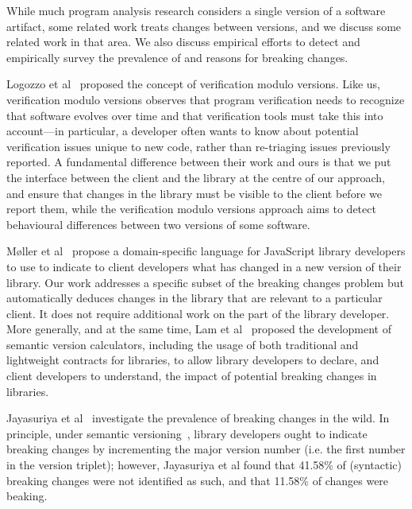 While much program analysis research considers a single version of a software artifact, some related work treats changes between versions, and we discuss some related work in that area. We also discuss empirical efforts to detect and empirically survey the prevalence of and reasons for breaking changes.

Logozzo et al~\cite{logozzo14:_verif_modul_version} proposed the concept of verification modulo versions. Like us, verification modulo versions observes that program verification needs to recognize that software evolves over time and that verification tools must take this into account---in particular, a developer often wants to know about potential verification issues unique to new code, rather than re-triaging issues previously reported. A fundamental difference between their work and ours is that we put the interface between the client and the library at the centre of our approach, and ensure that changes in the library must be visible to the client before we report them, while the verification modulo versions approach aims to detect behavioural differences between two versions of some software.

Møller et al~\cite{møller20:_detec_locat_javas_progr_affec} propose a domain-specific language for JavaScript library developers to use to indicate to client developers what has changed in a new version of their library. Our work addresses a specific subset of the breaking changes problem but automatically deduces changes in the library that are relevant to a particular client. It does not require additional work on the part of the library developer. More generally, and at the same time, Lam et al~\cite{lam20:_puttin_seman_seman_version} proposed the development of semantic version calculators, including the usage of both traditional and lightweight contracts for libraries, to allow library developers to declare, and client developers to understand, the impact of potential breaking changes in libraries.

Jayasuriya et al~\cite{jayasuriya23:_under_break_chang_wild,jayasuriya24} investigate the prevalence of breaking changes in the wild. In principle, under semantic versioning~\cite{preston-werner23:_seman_version}, library developers ought to indicate breaking changes by incrementing the major version number (i.e. the first number in the version triplet); however, Jayasuriya et al found that 41.58\% of (syntactic) breaking changes were not identified as such, and that 11.58\% of changes were beaking.

